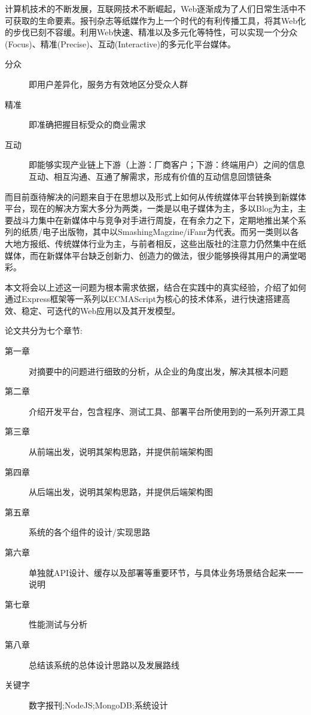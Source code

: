 
\noindent
计算机技术的不断发展，互联网技术不断崛起，Web逐渐成为了人们日常生活中不可获取的生命要素。报刊杂志等纸媒作为上一个时代的有利传播工具，将其Web化的步伐已刻不容缓。利用Web快速、精准以及多元化等特性，可以实现一个分众(Focus)、精准(Precise)、互动(Interactive)的多元化平台媒体。

\begin{description}
 	\item[分众] 即用户差异化，服务方有效地区分受众人群
	\item[精准] 即准确把握目标受众的商业需求
	\item[互动] 即能够实现产业链上下游（上游：厂商客户；下游：终端用户）之间的信息互动、相互沟通、互通了解需求，形成有价值的互动信息回馈链条
\end{description}

\indent
而目前亟待解决的问题来自于在思想以及形式上如何从传统媒体平台转换到新媒体平台，现在的解决方案大多分为两类，一类是以电子媒体为主，多以Blog为主，主要战斗力集中在新媒体中与竞争对手进行周旋，在有余力之下，定期地推出某个系列的纸质/电子出版物，其中以SmashingMagzine/iFanr为代表。而另一类则以各大地方报纸、传统媒体行业为主，与前者相反，这些出版社的注意力仍然集中在纸媒体，而在新媒体平台缺乏创新力、创造力的做法，很少能够换得其用户的满堂喝彩。

\indent
本文将会以上述这一问题为根本需求依据，结合在实践中的真实经验，介绍了如何通过Express框架等一系列以ECMAScript为核心的技术体系，进行快速搭建高效、稳定、可迭代的Web应用以及其开发模型。

\noindent
论文共分为七个章节:

\begin{description}
	\item[第一章] 对摘要中的问题进行细致的分析，从企业的角度出发，解决其根本问题
	\item[第二章] 介绍开发平台，包含程序、测试工具、部署平台所使用到的一系列开源工具
	\item[第三章] 从前端出发，说明其架构思路，并提供前端架构图
	\item[第四章] 从后端出发，说明其架构思路，并提供后端架构图
	\item[第五章] 系统的各个组件的设计/实现思路
	\item[第六章] 单独就API设计、缓存以及部署等重要环节，与具体业务场景结合起来一一说明
	\item[第七章] 性能测试与分析
	\item[第八章] 总结该系统的总体设计思路以及发展路线
 	\item[关键字] 数字报刊;NodeJS;MongoDB;系统设计
\end{description}